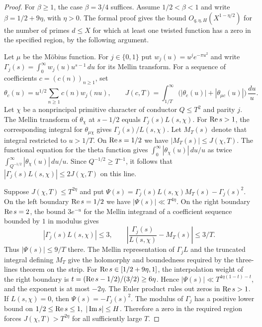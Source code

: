 \begin{proof}
For \(\beta\ge1\), the case \(\beta=3/4\) suffices.
Assume \(1/2<\beta<1\) and write \(\beta=1/2+9\eta\), with \(\eta>0\).
The formal proof gives the bound \(O_{q,\eta,H}(X^{1-\eta/2})\) for the number
of primes \(d\le X\) for which at least one twisted function has a zero
in the specified region, by the following argument.

Let \(\mu\) be the Möbius function. For \(j\in\{0,1\}\) put
\(w_j(u)=u^j e^{-\pi u^2}\) and write
\(\Gamma_j(s)=\int_0^\infty w_j(u)u^{s-1}\,du\) for its Mellin transform.
For a sequence of coefficients \(c=(c(n))_{n\ge1}\), set
\[
 \theta_c(u)=u^{1/2}\sum_{n\ge1}c(n)w_j(nu),\qquad
 J(c,T)=\int_{1/T}^\infty
        \bigl(|\theta_c(u)|+|\theta_{\mu c}(u)|\bigr)\,\frac{du}{u}.
\]
Let \(\chi\) be a nonprincipal primitive character of conductor \(Q\le T^2\)
and parity \(j\). The Mellin transform of \(\theta_\chi\) at \(s-1/2\) equals
\(\Gamma_j(s)L(s,\chi)\). For \(\operatorname{Re} s>1\), the corresponding integral for
\(\theta_{\mu\chi}\) gives \(\Gamma_j(s)/L(s,\chi)\). Let \(M_T(s)\) denote
that integral restricted to \(u>1/T\). On \(\operatorname{Re} s=1/2\) we have
\(|M_T(s)|\le J(\chi,T)\).
The functional equation for the theta function gives
\(\int_0^\infty |\theta_\chi(u)|\,du/u\) as twice
\(\int_{Q^{-1/2}}^\infty|\theta_\chi(u)|\,du/u\).
Since \(Q^{-1/2}\ge T^{-1}\), it follows that
\(|\Gamma_j(s)L(s,\chi)|\le2J(\chi,T)\) on this line.

Suppose \(J(\chi,T)\le T^{2\eta}\) and put
\(\Psi(s)=\Gamma_j(s)L(s,\chi)M_T(s)-\Gamma_j(s)^2\).
On the left boundary \(\operatorname{Re} s=1/2\) we have \(|\Psi(s)|\ll T^{4\eta}\).
On the right boundary \(\operatorname{Re} s=2\), the bound \(3e^{-u}\) for the
Mellin integrand of a coefficient sequence bounded by \(1\) in modulus gives
\[
 |\Gamma_j(s)L(s,\chi)|\le3,\qquad
 \left|\frac{\Gamma_j(s)}{L(s,\chi)}-M_T(s)\right|\le 3/T.
\]
Thus \(|\Psi(s)|\le9/T\) there. The Mellin representation of \(\Gamma_j L\) and
the truncated integral defining \(M_T\) give the holomorphy and boundedness
required by the three-lines theorem on the strip. For
\(\operatorname{Re} s\in[1/2+9\eta,1]\), the interpolation weight of the right boundary is
\(t=(\operatorname{Re} s-1/2)/(3/2)\ge6\eta\).
Hence \(|\Psi(s)|\ll T^{4\eta(1-t)-t}\), and the exponent is at most \(-2\eta\).
The Euler product rules out zeros in \(\operatorname{Re} s>1\).
If \(L(s,\chi)=0\), then \(\Psi(s)=-\Gamma_j(s)^2\).
The modulus of \(\Gamma_j\) has a positive lower bound on
\(1/2\le\operatorname{Re} s\le1,\ |\operatorname{Im} s|\le H\). Therefore a zero in the required
region forces \(J(\chi,T)>T^{2\eta}\) for all sufficiently large \(T\).


\end{proof}
